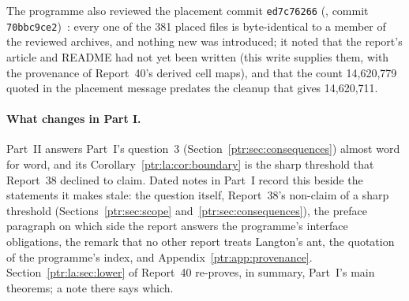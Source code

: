 \documentclass[11pt,letterpaper]{article}
\theoremstyle{definition}\newtheorem{definition}[theorem]{Definition}
\theoremstyle{remark}\newtheorem{remark}[theorem]{Remark}
\begin{document}
The programme also reviewed the placement commit \texttt{ed7c76266}
(, commit
\texttt{70bbc9ce2})~\cite{ptr:w:place88}: every one of the 381 placed files
is byte-identical to a member of the reviewed archives, and nothing new was
introduced; it noted that the report's article and README had not yet been
written (this write supplies them, with the provenance of Report~40's
derived cell maps), and that the count 14,620,779 quoted in the placement
message predates the cleanup that gives 14,620,711.

\paragraph{What changes in Part I.} Part~II answers Part~I's question~3
(Section~\ref{ptr:sec:consequences}) almost word for word, and its
Corollary~\ref{ptr:la:cor:boundary} is the sharp threshold that Report~38
declined to claim. Dated notes in Part~I record this beside the statements it
makes stale: the question itself, Report~38's non-claim of a sharp threshold
(Sections~\ref{ptr:sec:scope} and~\ref{ptr:sec:consequences}), the preface
paragraph on which side the report answers the programme's interface
obligations, the remark that no other report treats Langton's ant, the
quotation of the programme's index, and Appendix~\ref{ptr:app:provenance}.
Section~\ref{ptr:la:sec:lower} of Report~40 re-proves, in summary, Part~I's
main theorems; a note there says which.
\end{document}
